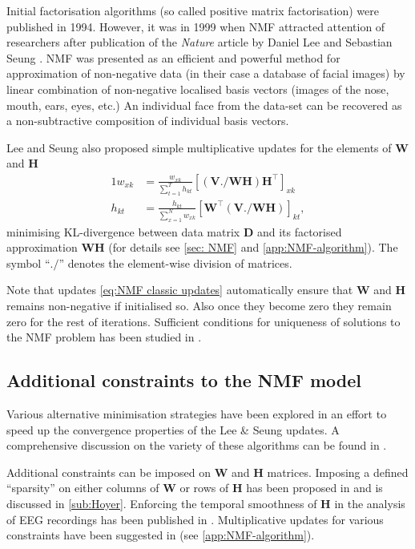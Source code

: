 Initial factorisation algorithms (so called positive matrix factorisation) \cite{Paatero1994} were published in 1994. However, it was in 1999 when NMF attracted attention of researchers after publication of the \emph{Nature} article by Daniel Lee and Sebastian Seung \cite{Lee1999}. NMF was presented as an efficient and powerful method for approximation of non-negative data (in their case a database of facial images) by linear combination of non-negative localised basis vectors (images of the nose, mouth, ears, eyes, etc.) An individual face from the data-set can be recovered as a non-subtractive composition of individual basis vectors. 

Lee and Seung also proposed simple multiplicative updates \cite{Lee2001} for the elements of $\bm{W}$ and $\bm{H}$
%
\begin{alignat}{1}
	w_{xk} & =\frac{w_{xk}}{\sum_{t=1}^{T}h_{kt}}\left[(\bm{V}./\bm{WH})\bm{H^{\top}}\right]_{xk}\nonumber \\
	h_{kt} & =\frac{h_{kt}}{\sum_{x=1}^{N}w_{xk}}\left[\bm{W^{\top}}(\bm{V}./\bm{WH})\right]_{kt},
	\label{eq:NMF classic updates}
\end{alignat}
%
minimising KL-divergence between data matrix $\bm{D}$ and its factorised approximation $\bm{WH}$ (for details see \autoref{sec: NMF} and \autoref{app:NMF-algorithm}). The symbol ``$./$'' denotes the element-wise division of matrices.

Note that updates \autoref{eq:NMF classic updates} automatically ensure that $\bm{W}$ and $\bm{H}$ remains non-negative if initialised so. Also once they become zero they remain zero for the rest of iterations. Sufficient conditions for uniqueness of solutions to the NMF problem has been studied in \cite{Donoho2004}. 


\subsection{Additional constraints to the NMF model \label{sub:NMF constrains}}
Various alternative minimisation strategies have been explored in an effort to speed up the convergence properties of the Lee \& Seung updates. A comprehensive discussion on the variety of these algorithms can be found in \cite{Berry2007}. 

Additional constraints can be imposed on $\bm{W}$ and $\bm{H}$ matrices. Imposing a defined ``sparsity'' on either columns of $\bm{W}$ or rows of $\bm{H}$ has been proposed in \cite{Hoyer2004} and is discussed in \autoref{sub:Hoyer}. Enforcing the temporal smoothness of $\bm{H}$ in the analysis of EEG recordings has been published in \cite{Chen2005}. Multiplicative updates for various constraints have been suggested in \cite{Chen2005,Pauca2006}  (see \autoref{app:NMF-algorithm}).

